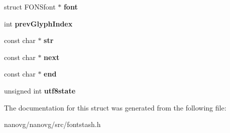 \begin{DoxyCompactItemize}
\item 
\hypertarget{struct_f_o_n_stext_iter_adca38e1f79a9b30af70f68f660b048a4}{struct F\+O\+N\+Sfont $\ast$ {\bfseries font}}\label{struct_f_o_n_stext_iter_adca38e1f79a9b30af70f68f660b048a4}

\item 
\hypertarget{struct_f_o_n_stext_iter_ad778bca2e7cd546fa9fe647408c3ab76}{int {\bfseries prev\+Glyph\+Index}}\label{struct_f_o_n_stext_iter_ad778bca2e7cd546fa9fe647408c3ab76}

\item 
\hypertarget{struct_f_o_n_stext_iter_afa9f4ba21030480d65c7fd4f1eab477c}{const char $\ast$ {\bfseries str}}\label{struct_f_o_n_stext_iter_afa9f4ba21030480d65c7fd4f1eab477c}

\item 
\hypertarget{struct_f_o_n_stext_iter_a18c670e9f18e733be4c92cd7e9b74ad3}{const char $\ast$ {\bfseries next}}\label{struct_f_o_n_stext_iter_a18c670e9f18e733be4c92cd7e9b74ad3}

\item 
\hypertarget{struct_f_o_n_stext_iter_ad92484b2073e6000da97840175852013}{const char $\ast$ {\bfseries end}}\label{struct_f_o_n_stext_iter_ad92484b2073e6000da97840175852013}

\item 
\hypertarget{struct_f_o_n_stext_iter_a325cc1ced940302cd1685adc6781de19}{unsigned int {\bfseries utf8state}}\label{struct_f_o_n_stext_iter_a325cc1ced940302cd1685adc6781de19}

\end{DoxyCompactItemize}


The documentation for this struct was generated from the following file\+:\begin{DoxyCompactItemize}
\item 
nanovg/nanovg/src/fontstash.\+h\end{DoxyCompactItemize}
